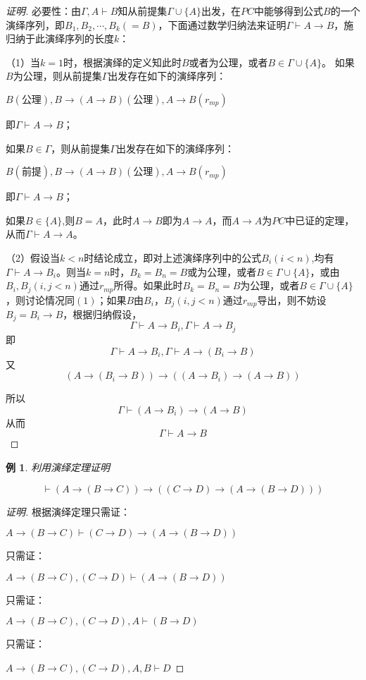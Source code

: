 \documentclass{article}
\newtheorem*{Example}{例}
\begin{document}
\begin{CJK*}{UTF8}{gbsn}
\begin{proof}[证明]
  必要性：由$\Gamma,A\vdash B$知从前提集$\Gamma\cup \{A\}$出发，在$PC$中能够得到公式$B$的一个演绎序列，即$B_1,B_2,\cdots,B_k(=B)$，下面通过数学归纳法来证明$\Gamma\vdash A\to B$，施归纳于此演绎序列的长度$k$：

  （1）当$k=1$时，根据演绎的定义知此时$B$或者为公理，或者$B\in \Gamma\cup\{A\}$。
  如果$B$为公理，则从前提集$\Gamma$出发存在如下的演绎序列：

  $B(\text{公理}),B\to(A\to B)(\text{公理}),A\to B(r_{mp})$

  即$\Gamma\vdash A\to B$；

  如果$B\in \Gamma$，则从前提集$\Gamma$出发存在如下的演绎序列：

  $B(\text{前提}),B\to(A\to B)(\text{公理}),A\to B(r_{mp})$

  即$\Gamma\vdash A\to B$；

  如果$B\in \{A\}$,则$B=A$，此时$A\to B$即为$A\to A$，而$A\to A$为$PC$中已证的定理，从而$\Gamma\vdash A\to A$。

  （2）假设当$k<n$时结论成立，即对上述演绎序列中的公式$B_i(i<n)$,均有$\Gamma\vdash A\to B_i$。则当$k=n$时，$B_k=B_n=B$或为公理，或者$B\in \Gamma\cup \{A\}$，或由$B_i,B_j(i,j<n)$通过$r_{mp}$所得。如果此时$B_k=B_n=B$为公理，或者$B\in \Gamma\cup\{A\}$，则讨论情况同$(1)$；如果$B$由$B_i$，$B_j(i,j<n)$通过$r_{mp}$导出，则不妨设$B_j=B_i\to B$，根据归纳假设，
  \[\Gamma\vdash A\to B_i, \Gamma\vdash A\to B_j\]
  即
  \[\Gamma\vdash A\to B_i, \Gamma\vdash A\to (B_i\to B)\]
  又
  \[(A\to(B_i\to B))\to ((A\to B_i)\to (A\to B))\]

  所以
  \[\Gamma\vdash (A\to B_i)\to(A\to B)\]
  从而
  \[\Gamma\vdash A\to B\]
\end{proof}
\begin{Example}
  利用演绎定理证明

  \[\vdash (A\to (B\to C))\to ((C\to D)\to (A\to (B\to D)))\]
\end{Example}
\begin{proof}[证明]
根据演绎定理只需证：

$A\to (B\to C)\vdash (C\to D)\to (A\to (B\to D))$

只需证：

$A\to (B\to C),(C\to D)\vdash (A\to (B\to D))$

只需证：

$A\to (B\to C),(C\to D), A\vdash (B\to D)$

只需证：

$A\to (B\to C),(C\to D), A, B\vdash D$


\end{proof}
\end{CJK*}
\end{document}
